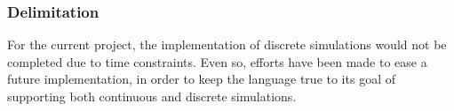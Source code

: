 \subsubsection{Delimitation}

For the current project, the implementation of discrete simulations would not be completed due to time constraints. Even so, efforts have been made to ease a future implementation, in order to keep the language true to its goal of supporting both continuous and discrete simulations.